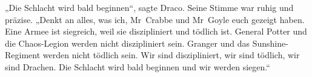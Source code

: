 „Die Schlacht wird bald beginnen“, sagte Draco. Seine Stimme war ruhig und präzise.
„Denkt an alles, was ich, Mr~Crabbe und Mr~Goyle euch gezeigt haben. Eine Armee ist siegreich, weil sie diszipliniert und tödlich ist. General Potter und die Chaos-Legion werden nicht diszipliniert sein. Granger und das Sunshine-Regiment werden nicht tödlich sein. Wir sind diszipliniert, wir sind tödlich, wir sind Drachen. Die Schlacht wird bald beginnen und wir werden siegen.“


